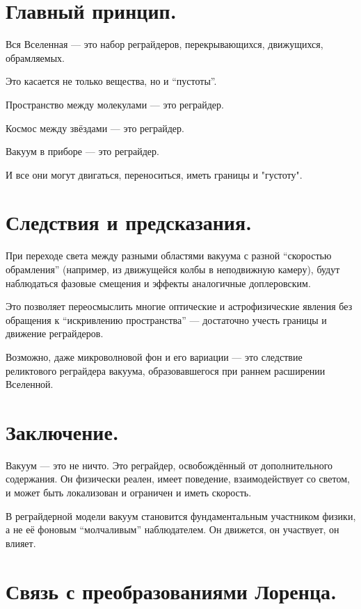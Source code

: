 \documentclass[12pt]{article}
\begin{document}
\section*{Главный принцип.}

Вся Вселенная — это набор реграйдеров, перекрывающихся, движущихся, обрамляемых.

Это касается не только вещества, но и “пустоты”.

Пространство между молекулами — это реграйдер.

Космос между звёздами — это реграйдер.

Вакуум в приборе — это реграйдер.

И все они могут двигаться, переноситься, иметь границы и "густоту".

\section*{Следствия и предсказания.}

При переходе света между разными областями вакуума с разной “скоростью обрамления” (например, из движущейся колбы в неподвижную камеру), будут наблюдаться фазовые смещения и эффекты аналогичные доплеровским.

Это позволяет переосмыслить многие оптические и астрофизические явления без обращения к “искривлению пространства” — достаточно учесть границы и движение реграйдеров.

Возможно, даже микроволновой фон и его вариации — это следствие реликтового реграйдера вакуума, образовавшегося при раннем расширении Вселенной.

\section*{Заключение.}

Вакуум — это не ничто. Это реграйдер, освобождённый от дополнительного содержания. Он физически реален, имеет поведение, взаимодействует со светом, и может быть локализован и ограничен и иметь скорость.

В реграйдерной модели вакуум становится фундаментальным участником физики, а не её фоновым “молчаливым” наблюдателем. Он движется, он участвует, он влияет.

\section*{Связь с преобразованиями Лоренца.}
\end{document}

